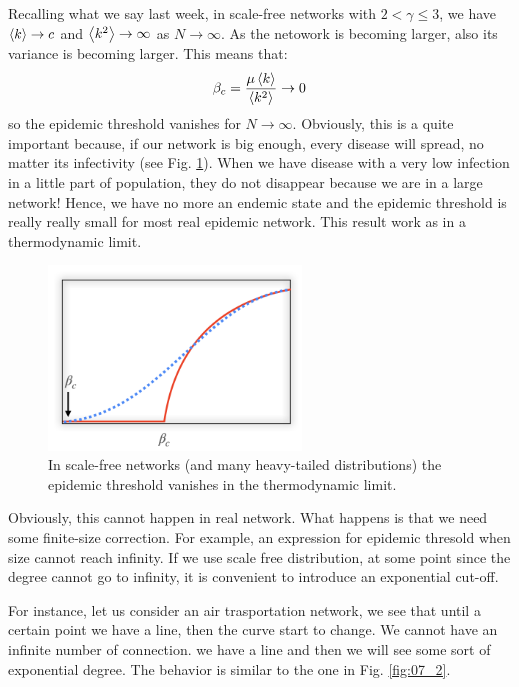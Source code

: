 \documentclass[../main/main.tex]{subfiles}
\begin{document}
Recalling what we say last week, in scale-free networks with \( 2 < \gamma \le 3  \), we have \( \expval{k} \rightarrow c  \) and \( \expval{k^2}  \rightarrow \infty  \) as \( N \rightarrow \infty  \).
As the netowork is becoming larger, also its variance is becoming larger. This means that:
\begin{equation*}
  \beta _c = \frac{\mu \expval{k} }{\expval{k^2} } \rightarrow 0
\end{equation*}
so the epidemic threshold vanishes for \( N \rightarrow \infty  \).
Obviously, this is a quite important because, if our network is big enough, every disease will spread, no matter its infectivity (see Fig. \ref{fig:07_1}). When we have disease with a very low infection in a little part of population, they do not disappear because we are in a large network!
Hence, we have no more an endemic state and the epidemic threshold is really really small for most real epidemic network.
This result work as in a thermodynamic limit.

\begin{figure}[h!]
\centering
\includegraphics[width=0.6\textwidth]{../lessons/image/07/1.png}
\caption{\label{fig:07_1} In scale-free networks (and many heavy-tailed distributions) the epidemic threshold vanishes in the thermodynamic limit.}
\end{figure}

Obviously, this cannot happen in real network. What happens is that we need some finite-size correction. For example, an expression for epidemic thresold when size cannot reach infinity.
If we use scale free distribution, at some point since the degree cannot go to infinity, it is convenient to introduce an exponential cut-off.

For instance, let us consider an air trasportation network, we see that until a certain point we have a line, then the curve start to change. We cannot have an infinite number of connection. we have a line and then we will see some sort of exponential degree. The behavior is similar to the one in Fig. \ref{fig:07_2}.
\end{document}
